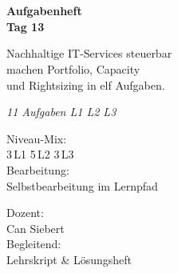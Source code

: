 \documentclass[11pt,a4paper,oneside]{article}
\newcommand{\caveatfontfallback}{\itshape}
\newcommand\caveatfont{\caveatfontfallback}%
\begin{document}
\begin{titlepage}
  \pagestyle{empty}
  \vspace*{1.5cm}
  \\[2pt]
  \noindent{\color{lpAccent}\rule{\linewidth}{1.2pt}}\\[4pt]

  \vspace{3cm}
  {\sffamily\fontsize{30}{34}\selectfont\bfseries\color{lpInk}Aufgabenheft\\Tag 13\par}

  \vspace{0.7cm}
  {\sffamily\large\color{lpGray}Nachhaltige IT-Services steuerbar\\machen \textendash{} Portfolio, Capacity\\und Rightsizing in elf Aufgaben.\par}

  \vspace{1.5cm}
  {\caveatfont\LARGE\color{lpAmber}11 Aufgaben \textperiodcentered{} L1 \textperiodcentered{} L2 \textperiodcentered{} L3}\par

  \vfill

  \noindent\begin{minipage}{0.55\linewidth}
    {\sffamily\footnotesize\color{lpGray}Niveau-Mix:}\\
    {\sffamily\small\color{lpInk}3\,\textsf{L1} \textperiodcentered{} 5\,\textsf{L2} \textperiodcentered{} 3\,\textsf{L3}}\\[10pt]
    {\sffamily\footnotesize\color{lpGray}Bearbeitung:}\\
    {\sffamily\small\color{lpInk}Selbstbearbeitung im Lernpfad}
  \end{minipage}\hfill
  \begin{minipage}{0.4\linewidth}
    \raggedleft
    {\sffamily\footnotesize\color{lpGray}Dozent:}\\
    {\sffamily\small\color{lpInk}Can Siebert}\\[10pt]
    {\sffamily\footnotesize\color{lpGray}Begleitend:}\\
    {\sffamily\small\color{lpInk}Lehrskript \& L\"osungsheft}
  \end{minipage}

  \vspace{0.5cm}
  \noindent{\color{lpAccent}\rule{\linewidth}{0.6pt}}
\end{titlepage}
\end{document}
